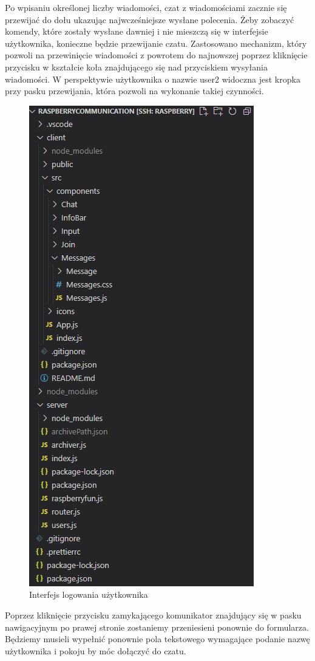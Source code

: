 Po wpisaniu określonej liczby wiadomości, czat z wiadomościami zacznie się przewijać do dołu ukazując najwcześniejsze wysłane polecenia. Żeby zobaczyć komendy, które zostały wysłane dawniej  i nie mieszczą się w interfejsie użytkownika, konieczne będzie przewijanie czatu. Zastosowano mechanizm, który pozwoli na przewinięcie wiadomości z powrotem do najnowszej poprzez kliknięcie przycisku w kształcie koła znajdującego się nad przyciskiem wysyłania wiadomości. W perspektywie użytkownika o nazwie user2 widoczna jest kropka przy pasku przewijania, która pozwoli na wykonanie takiej czynności.
\begin{figure}
	\centering
	\includegraphics[width=0.5\linewidth]{"obrazy/model"}
	\caption{Interfejs logowania użytkownika}
	\label{fig:49}
\end{figure}
Poprzez kliknięcie przycisku zamykającego komunikator znajdujący się w pasku nawigacyjnym po prawej stronie zostaniemy przeniesieni ponownie do formularza.  Będziemy musieli wypełnić ponownie pola tekstowego wymagające podanie nazwę użytkownika i pokoju by móc dołączyć do czatu.
